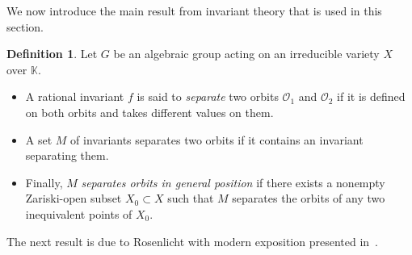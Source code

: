 \documentclass[12pt,a4paper]{extarticle}
\theoremstyle{definition}
\newtheorem{definition}[theorem]{Definition}
\newcommand{\K}{\mathbb{K}}
\begin{document}
We now introduce the main result from invariant theory that is used in this section.
\begin{definition}
Let $G$ be an algebraic group acting on an irreducible variety $X$ over $\K$.
\begin{itemize}
    \item A rational invariant $f$ is said to \emph{separate} two orbits
$\mathcal{O}_1$ and $\mathcal{O}_2$ if it is defined on both orbits and takes
different values on them.
\item  A set $M$ of invariants separates
two orbits if it contains an invariant  separating
them. 
\item Finally, $M$ \emph{separates orbits in general position} if
there exists a nonempty Zariski-open subset $X_0 \subset X$ such that $M$ separates the
orbits of any two inequivalent points of $X_0$.
\end{itemize}
\end{definition}
\noindent
The next result is due to Rosenlicht with modern exposition presented 
in~\cite[Chapter~2]{PopovVinberg}.
\end{document}
